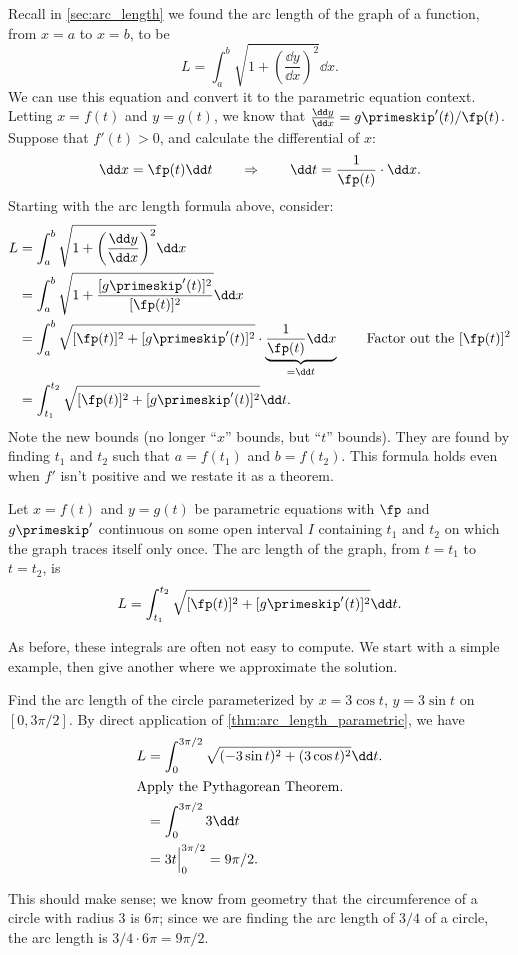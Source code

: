 Recall in \autoref{sec:arc_length} we found the arc length of the graph of a function, from $x=a$ to $x=b$, to be
\[L = \int_a^b\sqrt{1+\left(\frac{\dd y}{\dd x}\right)^2}\dd x.\]
We can use this equation and convert it to the parametric equation context. Letting $x=f(t)$ and $y=g(t)$, we know that $\frac{\dd y}{\dd x} = g\primeskip'(t)/\fp(t)$. Suppose that $f'(t)>0$, and calculate the differential of $x$:
\[\dd x = \fp(t)\dd t \qquad \Rightarrow \qquad \dd t = \frac{1}{\fp(t)}\cdot \dd x.\]
Starting with the arc length formula above, consider:
\begin{align*}
	L &= \int_a^b\sqrt{1+\left(\frac{\dd y}{\dd x}\right)^2}\dd x\\
	&= \int_a^b \sqrt{1+\frac{[g\primeskip'(t)]^2}{[\fp(t)]^2}}\dd x \\
	&= \int_a^b \sqrt{[\fp(t)]^2+[g\primeskip'(t)]^2}\cdot\underbrace{\frac1{\fp(t)}\dd x}_{=\dd t} \qquad\text{Factor out the $[\fp(t)]^2$} \\
	&= \int_{t_1}^{t_2} \sqrt{[\fp(t)]^2+[g\primeskip'(t)]^2}\dd t.\\
\end{align*}
Note the new bounds (no longer ``$x$'' bounds, but ``$t$'' bounds). They are found by finding $t_1$ and $t_2$ such that $a= f(t_1)$ and $b=f(t_2)$. This formula holds even when $f'$ isn't positive and we restate it as a theorem.

\begin{theorem}\label{thm:arc_length_parametric}
Let $x=f(t)$ and $y=g(t)$ be parametric equations with $\fp$ and $g\primeskip'$ continuous on some open interval $I$ containing $t_1$ and $t_2$ on which the graph traces itself only once. The arc length of the graph, from $t=t_1$ to $t=t_2$, is
\[L = \int_{t_1}^{t_2} \sqrt{[\fp(t)]^2+[g\primeskip'(t)]^2}\dd t.\]
\end{theorem}

As before, these integrals are often not easy to compute. We start with a simple example, then give  another where we approximate the solution.

\begin{example}\label{ex_parcalc6}
Find the arc length of the circle parameterized by $x=3\cos t$, $y=3\sin t$ on $[0,3\pi/2]$. 
\solution
By direct application of \autoref{thm:arc_length_parametric}, we have
\begin{align*}
L &= \int_0^{3\pi/2} \sqrt{(-3\sin t)^2 +(3\cos t)^2} \dd t.\\
\intertext{Apply the Pythagorean Theorem.}
	&= \int_0^{3\pi/2} 3 \dd t\\
	&= 3t\Big|_0^{3\pi/2} = 9\pi/2.
	\end{align*}
	
This should make sense; we know from geometry that the circumference of a circle with radius 3 is $6\pi$; since we are finding the arc length of $3/4$ of a circle, the arc length is $3/4\cdot 6\pi = 9\pi/2$.
\end{example}

